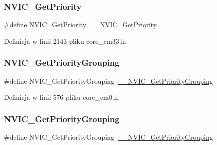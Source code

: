 \subsubsection{\texorpdfstring{N\+V\+I\+C\+\_\+\+Get\+Priority}{NVIC\_GetPriority}\hspace{0.1cm}{\footnotesize\ttfamily [12/12]}}
{\footnotesize\ttfamily \#define N\+V\+I\+C\+\_\+\+Get\+Priority~\hyperlink{group___c_m_s_i_s___core___n_v_i_c_functions_gaeb9dc99c8e7700668813144261b0bc73}{\+\_\+\+\_\+\+N\+V\+I\+C\+\_\+\+Get\+Priority}}



Definicja w linii 2143 pliku core\+\_\+cm33.\+h.

\mbox{\label{group___c_m_s_i_s___core___n_v_i_c_functions_ga4eeb9214f2264fc23c34ad5de2d3fa11}} 
\subsubsection{\texorpdfstring{N\+V\+I\+C\+\_\+\+Get\+Priority\+Grouping}{NVIC\_GetPriorityGrouping}\hspace{0.1cm}{\footnotesize\ttfamily [1/10]}}
{\footnotesize\ttfamily \#define N\+V\+I\+C\+\_\+\+Get\+Priority\+Grouping~\hyperlink{group___c_m_s_i_s___core___n_v_i_c_functions_ga9b894af672df4373eb637f8288845c05}{\+\_\+\+\_\+\+N\+V\+I\+C\+\_\+\+Get\+Priority\+Grouping}}



Definicja w linii 576 pliku core\+\_\+cm0.\+h.

\mbox{\label{group___c_m_s_i_s___core___n_v_i_c_functions_ga4eeb9214f2264fc23c34ad5de2d3fa11}} 
\subsubsection{\texorpdfstring{N\+V\+I\+C\+\_\+\+Get\+Priority\+Grouping}{NVIC\_GetPriorityGrouping}\hspace{0.1cm}{\footnotesize\ttfamily [2/10]}}
{\footnotesize\ttfamily \#define N\+V\+I\+C\+\_\+\+Get\+Priority\+Grouping~\hyperlink{group___c_m_s_i_s___core___n_v_i_c_functions_ga9b894af672df4373eb637f8288845c05}{\+\_\+\+\_\+\+N\+V\+I\+C\+\_\+\+Get\+Priority\+Grouping}}



